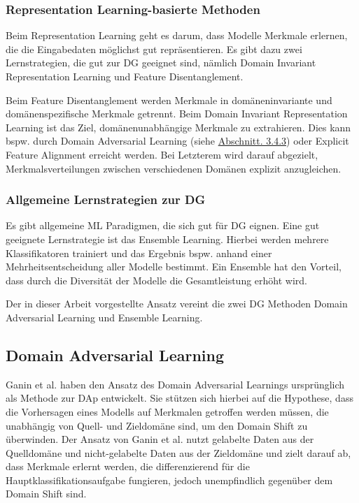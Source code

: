 \subsubsection*{Representation Learning-basierte Methoden}

Beim Representation Learning geht es darum, dass Modelle Merkmale erlernen, die die Eingabedaten möglichst gut repräsentieren. Es gibt dazu zwei Lernstrategien, die gut zur \gls{DG} geeignet sind, nämlich Domain Invariant Representation Learning und Feature Disentanglement. 

Beim Feature Disentanglement werden Merkmale in domäneninvariante und domänenspezifische Merkmale getrennt. 
Beim Domain Invariant Representation Learning ist das Ziel, domänenunabhängige Merkmale zu extrahieren. Dies kann bspw. durch Domain Adversarial Learning (siehe \hyperref[sec:DAL]{Abschnitt. 3.4.3}) oder Explicit Feature Alignment erreicht werden. Bei Letzterem wird darauf abgezielt, Merkmalsverteilungen zwischen verschiedenen Domänen explizit anzugleichen. \cite{wang_generalizing_2023} 




\subsubsection*{Allgemeine Lernstrategien zur \gls{DG}}

Es gibt allgemeine \gls{ML} Paradigmen, die sich gut für \gls{DG} eignen. Eine gut geeignete Lernstrategie ist das Ensemble Learning. Hierbei werden mehrere Klassifikatoren trainiert und das Ergebnis bspw. anhand einer Mehrheitsentscheidung aller Modelle bestimmt. Ein Ensemble hat den Vorteil, dass durch die Diversität der Modelle die Gesamtleistung erhöht wird. \cite{wang_generalizing_2023} 

 
 
Der in dieser Arbeit vorgestellte Ansatz vereint die zwei \gls{DG} Methoden Domain Adversarial Learning und Ensemble Learning.

\subsection{Domain Adversarial Learning}\label{sec:DAL}

Ganin et al. \cite{ganin_domain-adversarial_2016} haben den Ansatz des Domain Adversarial Learnings ursprünglich als Methode zur \gls{DAp} entwickelt. Sie stützen sich hierbei auf die Hypothese, dass die Vorhersagen eines Modells auf Merkmalen getroffen werden müssen, die unabhängig von Quell- und Zieldomäne sind, um den Domain Shift zu überwinden.
Der Ansatz von Ganin et al. nutzt gelabelte Daten aus der Quelldomäne und nicht-gelabelte Daten aus der Zieldomäne und zielt darauf ab, dass Merkmale erlernt werden, die differenzierend für die Hauptklassifikationsaufgabe fungieren, jedoch unempfindlich gegenüber dem Domain Shift sind. 

